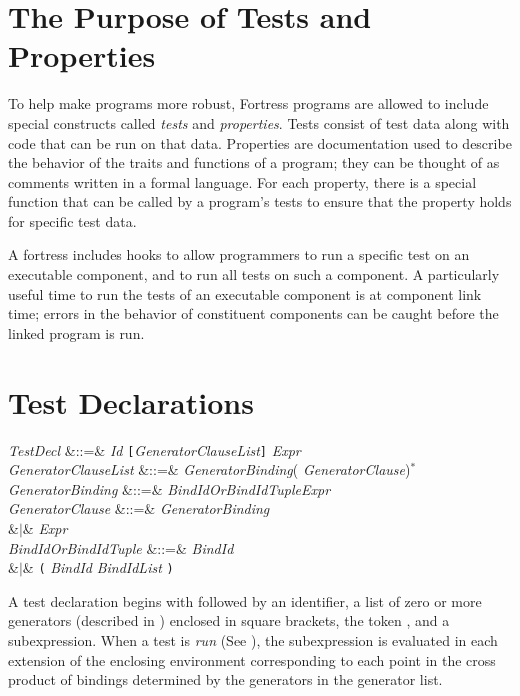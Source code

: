 \section{The Purpose of Tests and Properties}
To help make programs more robust, Fortress programs are allowed
to include special constructs called
\emph{tests} and \emph{properties}.  Tests consist of test data
along with code that can be run on that data.
Properties are documentation used to describe the behavior
of the traits and functions of a program; they can be thought of
as comments written in a formal language.
For each property, there is a special function that can be
called by a program's tests to ensure that the property holds for specific
test data.


A fortress includes hooks to allow programmers to run a specific test
on an executable component, and to run all tests on such a component.
A particularly useful time to run
the tests of an executable component is at component link time;
errors in the behavior of constituent components can be caught
before the linked program is run.


\section{Test Declarations}

\begin{Grammar}
\emph{TestDecl} &::=&  \emph{Id} \texttt[\emph{GeneratorClauseList}\texttt]
\EXP{=} \emph{Expr} \\

\emph{GeneratorClauseList} &::=& \emph{GeneratorBinding}(\EXP{,} \emph{GeneratorClause})$^*$\\

\emph{GeneratorBinding}
&::=& \emph{BindIdOrBindIdTuple}\EXP{\leftarrow}\emph{Expr} \\

\emph{GeneratorClause}
&::=& \emph{GeneratorBinding}\\
&$|$& \emph{Expr} \\

\emph{BindIdOrBindIdTuple}
&::=& \emph{BindId}\\
&$|$& \texttt{(} \emph{BindId}\EXP{,} \emph{BindIdList} \texttt{)}\\

\end{Grammar}

A test declaration begins with
 followed by an identifier, a list of zero or more generators
(described in ) enclosed in square brackets, the
token \EXP{=}, and a subexpression.
When a test is \emph{run} (See ), the
subexpression is evaluated in each extension of the enclosing environment
corresponding to each point in the cross product
of bindings determined by the generators in the generator list.

